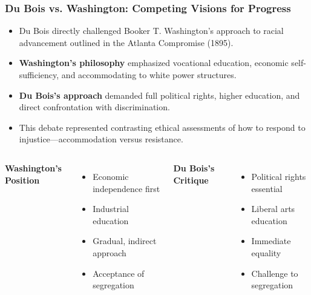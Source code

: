 \documentclass{beamer}
\begin{document}
	\begin{frame}
		\frametitle{Du Bois vs. Washington: Competing Visions for Progress}
		
		\begin{itemize}
			\item Du Bois directly challenged Booker T. Washington's approach to racial advancement outlined in the Atlanta Compromise (1895).
			\item \textbf{Washington's philosophy} emphasized vocational education, economic self-sufficiency, and accommodating to white power structures.
			\item \textbf{Du Bois's approach} demanded full political rights, higher education, and direct confrontation with discrimination.
			\item This debate represented contrasting ethical assessments of how to respond to injustice—accommodation versus resistance.
		\end{itemize}
		
		\begin{columns}
			\textbf{Washington's Position}
			\begin{itemize}
				\item Economic independence first
				\item Industrial education
				\item Gradual, indirect approach
				\item Acceptance of segregation
			\end{itemize}
			
			\textbf{Du Bois's Critique}
			\begin{itemize}
				\item Political rights essential
				\item Liberal arts education
				\item Immediate equality
				\item Challenge to segregation
			\end{itemize}
		\end{columns}
		
	\end{frame}
	
\end{document}
